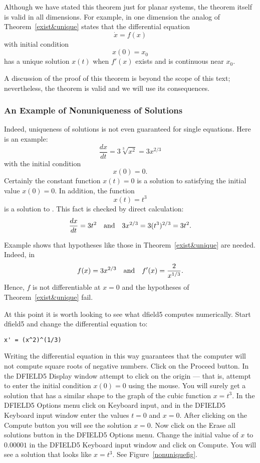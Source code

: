 Although we have stated this theorem just for planar systems, the theorem
itself is valid in all dimensions.   For example, in one dimension the analog
of Theorem~\ref{exist&unique} states that the differential equation
\[
\dot{x} = f(x)
\]
with initial condition
\[
x(0)=x_0
\]
has a unique solution $x(t)$ when $f'(x)$ exists and is
continuous near $x_0$.

A discussion of the proof of this theorem is beyond the scope of this text;
nevertheless, the theorem is valid and we will use its consequences.

\subsubsection*{An Example of Nonuniqueness of Solutions}

Indeed, uniqueness of solutions is not even
guaranteed for single equations.  Here is an example:
\begin{equation}  \label{nonunique}
\frac{dx}{dt} = 3\sqrt[3]{x^2} = 3x^{2/3}
\end{equation}
with the initial condition
\[
x(0)=0.
\]
Certainly the constant function $x(t)=0$ is a solution to 
satisfying the initial value $x(0)=0$.  In addition, the function
\[
x(t) = t^3
\]
is a solution to .  This fact is checked by direct
calculation:
\[
\frac{dx}{dt} = 3t^2 \quad\mbox{and}\quad  3x^{2/3}= 3(t^3)^{2/3} = 3t^2.
\]

Example  shows that hypotheses like those in
Theorem~\ref{exist&unique} are needed.  Indeed, in 
\[
f(x)=3x^{2/3} \quad\mbox{and}\quad f'(x) = \frac{2}{x^{1/3}}.
\]
Hence, $f$ is not differentiable at $x=0$ and the hypotheses of
Theorem~\ref{exist&unique} fail.

At this point it is worth looking to see what {\sf dfield5}
computes numerically.  Start {\sf dfield5}  and
change the differential equation to:
\begin{verbatim}
x' = (x^2)^(1/3)
\end{verbatim}
Writing the differential equation in this way guarantees that
the computer will not compute square roots of negative numbers.
Click on the {\sf Proceed} button.  In the {\sf DFIELD5 Display}
window attempt to click on the origin --- that is, attempt to
enter the initial condition $x(0)=0$ using the mouse.  You will surely get
a solution that has a similar shape to the graph of the cubic function
$x=t^3$.  In the {\sf DFIELD5 Options} menu click on {\sf Keyboard input},
and in the {\sf DFIELD5 Keyboard input} window enter the
values $t=0$ and $x=0$.  After clicking on the {\sf Compute}
button you will see the solution $x=0$.  Now click on the {\sf
Erase all solutions} button in the {\sf DFIELD5 Options} menu.
Change the initial value of $x$ to $0.00001$ in the {\sf DFIELD5
Keyboard input} window and click on {\sf Compute}.  You will see
a solution that looks like $x=t^3$.  See Figure~\ref{nonuniquefig}.

